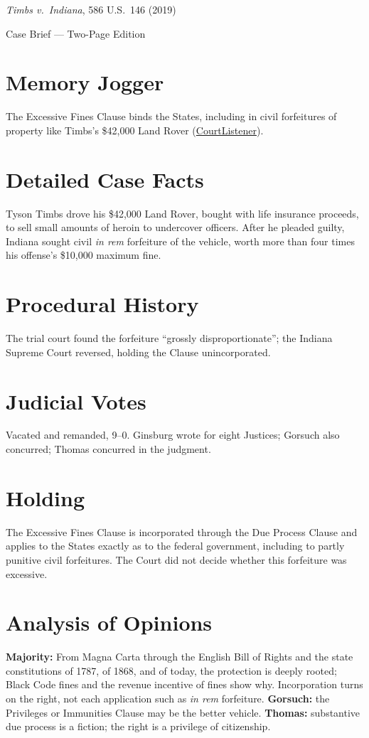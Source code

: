 \documentclass[12pt]{article}
\begin{document}
\begin{center}
{\LARGE \textit{Timbs v.\ Indiana}, 586 U.S.\ 146 (2019)\par}
\vspace{0.5em}
{\large Case Brief --- Two-Page Edition\par}
\end{center}

\section{Memory Jogger}
The Excessive Fines Clause binds the States, including in civil forfeitures of property like Timbs's \$42,000 Land Rover (\href{https://www.courtlistener.com/opinion/4591916/timbs-v-indiana/}{CourtListener}).

\section{Detailed Case Facts}
Tyson Timbs drove his \$42,000 Land Rover, bought with life insurance proceeds, to sell small amounts of heroin to undercover officers. After he pleaded guilty, Indiana sought civil \textit{in rem} forfeiture of the vehicle, worth more than four times his offense's \$10,000 maximum fine.

\section{Procedural History}
The trial court found the forfeiture ``grossly disproportionate''; the Indiana Supreme Court reversed, holding the Clause unincorporated.

\section{Judicial Votes}
Vacated and remanded, 9--0. Ginsburg wrote for eight Justices; Gorsuch also concurred; Thomas concurred in the judgment.

\section{Holding}
The Excessive Fines Clause is incorporated through the Due Process Clause and applies to the States exactly as to the federal government, including to partly punitive civil forfeitures. The Court did not decide whether this forfeiture was excessive.

\section{Analysis of Opinions}
\textbf{Majority:} From Magna Carta through the English Bill of Rights and the state constitutions of 1787, of 1868, and of today, the protection is deeply rooted; Black Code fines and the revenue incentive of fines show why. Incorporation turns on the right, not each application such as \textit{in rem} forfeiture. \textbf{Gorsuch:} the Privileges or Immunities Clause may be the better vehicle. \textbf{Thomas:} substantive due process is a fiction; the right is a privilege of citizenship.
\end{document}
